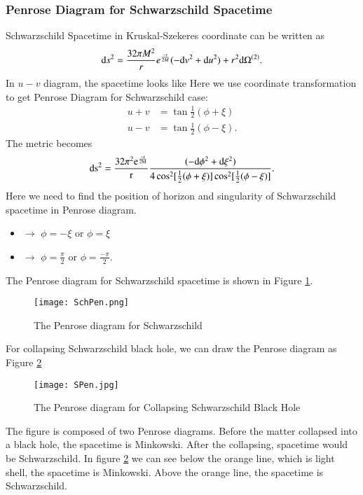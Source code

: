 \documentclass[openany,10pt]{book}
\theoremstyle{definition}
\theoremstyle{definition}
\theoremstyle{remark}
\begin{document}
\subsubsection{Penrose Diagram for Schwarzschild Spacetime}
Schwarzschild Spacetime in Kruskal-Szekeres coordinate can be written as 
\begin{equation}
    {\rm{d}}s^2=\frac{32\pi M^2}{r}e^{\frac{-r}{2M}}(-{\rm{d}}v^2+{\rm{d}}u^2)+r^2{\rm{d}}\Omega^{(2)}.
\end{equation}
In $u-v$ diagram, the spacetime looks like 
Here we use coordinate transformation to get Penrose Diagram for Schwarzschild case: 
\begin{equation}
    \begin{aligned}
        u+v&=\tan\frac{1}{2}(\phi+\xi)\\
        u-v&=\tan\frac{1}{2}(\phi-\xi).
    \end{aligned}
\end{equation}
The metric becomes 
\begin{equation}
    \rm{d}s^2=\frac{32\pi^2e^{\frac{-r}{2M}}}{r}\frac{(-\rm{d}\phi^2+{\rm{d}\xi^2)}}{4\cos^2[\frac{1}{2}(\phi+\xi)]\cos^2[\frac{1}{2}(\phi-\xi)]}.
\end{equation}
Here we need to find the position of horizon and singularity of Schwarzschild spacetime in Penrose diagram.\\
\begin{itemize}
    \item {$\to$ $\phi=-\xi$ or $\phi=\xi$}
    \item{$\to$ $\phi=\frac{\pi}{2}$ or $\phi=\frac{-\pi}{2}$. }
\end{itemize}



The Penrose diagram for Schwarzschild spacetime is shown in Figure \ref{SchPen}.

\begin{figure}[htbp]
    \centering
    \texttt{[image: SchPen.png]}
    \caption{The Penrose diagram for Schwarzschild}
    \label{SchPen}
\end{figure}

For collapsing Schwarzschild black hole, we can draw the Penrose diagram as Figure \ref{SPen}
\begin{figure}[htbp]
    \centering
    \texttt{[image: SPen.jpg]}
    \caption{The Penrose diagram for Collapsing Schwarzschild Black Hole }
    \label{SPen}
\end{figure}
The figure is composed of two Penrose diagrams. Before the matter collapsed into a black hole, the spacetime is Minkowski. After the collapsing, spacetime would be Schwarzschild. In figure \ref{SPen} we can see below the orange line, which is light shell, the spacetime is Minkowski. Above the orange line, the spacetime is Schwarzschild. 
\end{document}
